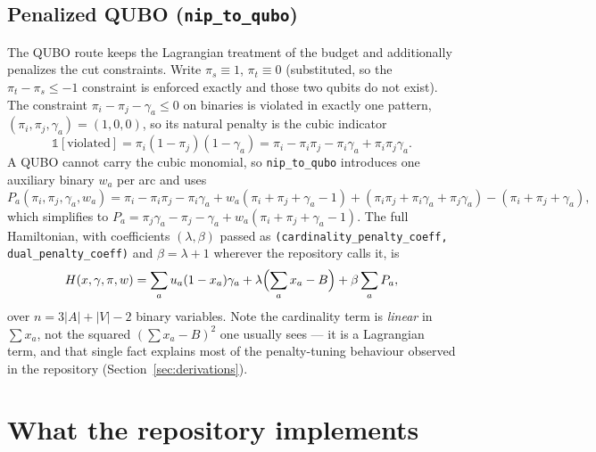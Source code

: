 \documentclass[11pt]{article}
\newcommand{\code}[1]{\texttt{#1}}
\begin{document}
\subsection{Penalized QUBO (\code{nip\_to\_qubo})}
\label{sec:qubo}

The QUBO route keeps the Lagrangian treatment of the budget and additionally penalizes the cut constraints. Write $\pi_s \equiv 1$, $\pi_t \equiv 0$ (substituted, so the $\pi_t - \pi_s \le -1$ constraint is enforced exactly and those two qubits do not exist). The constraint $\pi_i - \pi_j - \gamma_a \le 0$ on binaries is violated in exactly one pattern, $(\pi_i,\pi_j,\gamma_a) = (1,0,0)$, so its natural penalty is the cubic indicator
\[
\mathbb{1}[\text{violated}] = \pi_i (1-\pi_j)(1-\gamma_a) = \pi_i - \pi_i\pi_j - \pi_i\gamma_a + \pi_i\pi_j\gamma_a .
\]
A QUBO cannot carry the cubic monomial, so \code{nip\_to\_qubo} introduces one auxiliary binary $w_a$ per arc and uses
\begin{equation}
\label{eq:Pa}
P_a(\pi_i,\pi_j,\gamma_a,w_a) = \pi_i - \pi_i\pi_j - \pi_i\gamma_a + w_a(\pi_i + \pi_j + \gamma_a - 1) + (\pi_i\pi_j + \pi_i\gamma_a + \pi_j\gamma_a) - (\pi_i + \pi_j + \gamma_a),
\end{equation}
which simplifies to $P_a = \pi_j\gamma_a - \pi_j - \gamma_a + w_a(\pi_i+\pi_j+\gamma_a-1)$. The full Hamiltonian, with coefficients $(\lambda, \beta)$ passed as \code{(cardinality\_penalty\_coeff, dual\_penalty\_coeff)} and $\beta = \lambda + 1$ wherever the repository calls it, is
\begin{equation}
\label{eq:H}
H(x,\gamma,\pi,w) = \sum_a u_a(1-x_a)\gamma_a + \lambda\Bigl(\sum_a x_a - B\Bigr) + \beta \sum_a P_a ,
\end{equation}
over $n = 3|A| + |V| - 2$ binary variables. Note the cardinality term is \emph{linear} in $\sum x_a$, not the squared $(\sum x_a - B)^2$ one usually sees --- it is a Lagrangian term, and that single fact explains most of the penalty-tuning behaviour observed in the repository (Section~\ref{sec:derivations}).

\section{What the repository implements}
\label{sec:impl}
\end{document}

